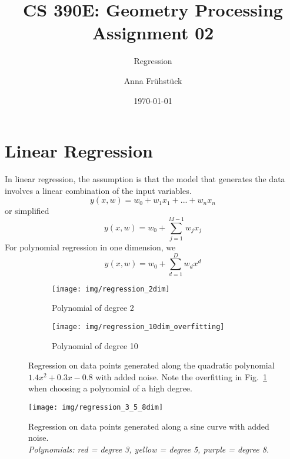 \documentclass{scrartcl}
\title{CS 390E: Geometry Processing \\ Assignment 02} %
\subtitle{Regression}
\author{Anna Fr\"{u}hst\"{u}ck} %
\date{\today}
\begin{document}
\maketitle %



\section{Linear Regression}
In linear regression, the assumption is that the model that generates the data involves a linear combination of the input variables.
$$y(x, w) = w_0 + w_1x_1 + ... + w_nx_n$$
or simplified 
$$y(x, w) = w_0 + \sum_{j=1}^{M-1}{w_jx_j}$$
For polynomial regression in one dimension, we 
$$y(x, w) = w_0 + \sum_{d=1}^{D}{w_dx^d}$$

\begin{figure}[H]
	\centering
	\begin{subfigure}{.45\textwidth}
		\centering
		\texttt{[image: img/regression\_2dim]}
		\caption{Polynomial of degree 2}
	\end{subfigure}%
	\begin{subfigure}{.45\textwidth}
		\centering
		\texttt{[image: img/regression\_10dim\_overfitting]}
		\caption{Polynomial of degree 10}
		\label{fig:regression1overfitting}
	\end{subfigure}%
	\caption{
		Regression on data points generated along the quadratic polynomial $1.4x^2 + 0.3x - 0.8$ with added noise. Note the overfitting in Fig.~\ref{fig:regression1overfitting} when choosing a polynomial of a high degree.
	}
	\label{fig:regression1}
\end{figure}

\begin{figure}[H]
	\texttt{[image: img/regression\_3\_5\_8dim]}
	\caption{
		Regression on data points generated along a sine curve with added noise.\\ 
		{\footnotesize \textit{Polynomials: red = degree 3, yellow = degree 5, purple = degree 8.}}
		}
	\label{fig:regression2}
\end{figure}
\end{document}
